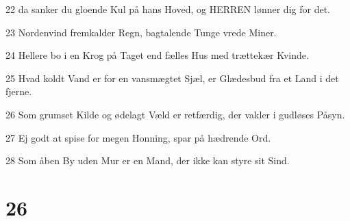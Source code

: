 \par 22 da sanker du gloende Kul på hans Hoved, og HERREN lønner dig for det.
\par 23 Nordenvind fremkalder Regn, bagtalende Tunge vrede Miner.
\par 24 Hellere bo i en Krog på Taget end fælles Hus med trættekær Kvinde.
\par 25 Hvad koldt Vand er for en vansmægtet Sjæl, er Glædesbud fra et Land i det fjerne.
\par 26 Som grumset Kilde og ødelagt Væld er retfærdig, der vakler i gudløses Påsyn.
\par 27 Ej godt at spise for megen Honning, spar på hædrende Ord.
\par 28 Som åben By uden Mur er en Mand, der ikke kan styre sit Sind.

\chapter{26}

